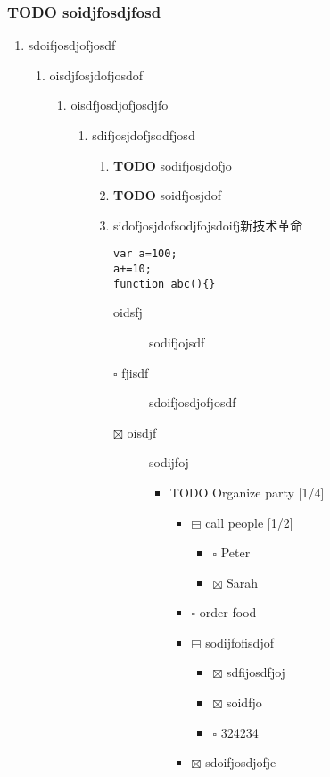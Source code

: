 \documentclass[11pt]{article}
\begin{document}
\subsubsection{{\bfseries\sffamily TODO} soidjfosdjfosd}
\label{sec:orgheadline16}
\begin{enumerate}
\item sdoifjosdjofjosdf
\label{sec:orgheadline15}
\begin{enumerate}
\item oisdjfosjdofjosdof
\label{sec:orgheadline14}
\begin{enumerate}
\item oisdfjosdjofjosdjfo
\label{sec:orgheadline11}
\begin{enumerate}
\item sdifjosjdofjsodfjosd
\label{sec:orgheadline8}
\begin{enumerate}
\item {\bfseries\sffamily TODO} sodifjosjdofjo
\label{sec:orgheadline3}
\item {\bfseries\sffamily TODO} soidfjosjdof
\label{sec:orgheadline4}
\item sidofjosjdofsodjfojsdoifj新技术革命
\label{sec:orgheadline5}

\begin{verbatim}
var a=100;
a+=10;
function abc(){}
\end{verbatim}

\begin{description}
\item[{oidsfj}] sodifjojsdf
\item[{$\square$ fjisdf}] sdoifjosdjofjosdf

\item[{$\boxtimes$ oisdjf}] sodijfoj

\begin{itemize}
\item TODO Organize party [1/4]
\begin{itemize}
\item $\boxminus$ call people [1/2]
\begin{itemize}
\item $\square$ Peter
\item $\boxtimes$ Sarah
\end{itemize}
\item $\square$ order food
\item $\boxminus$ sodijfofisdjof
\begin{itemize}
\item $\boxtimes$ sdfijosdfjoj
\item $\boxtimes$ soidfjo
\item $\square$ 324234
\end{itemize}
\item $\boxtimes$ sdoifjosdjofje
\end{itemize}
\end{itemize}


\end{description}
\end{enumerate}
\end{enumerate}
\end{enumerate}
\end{enumerate}
\end{enumerate}
\end{document}
